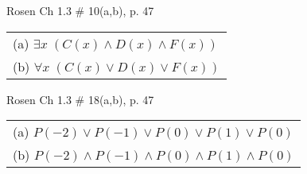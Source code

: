 \documentclass[12pt,addpoints]{exam}
\begin{document}
\begin{questions}
\question[4] Rosen Ch 1.3 \# 10(a,b), p. 47 
	\begin{solution}
    \begin{tabular}{l}
    (a) $\exists x\; (C(x) \wedge D(x) \wedge F(x))$ \\
    (b) $\forall x\; (C(x) \vee D(x) \vee F(x))$ \\
    \end{tabular}
    \end{solution}

\question[4] Rosen Ch 1.3 \# 18(a,b), p. 47 
	\begin{solution}
    \begin{tabular}{l}
    (a) $P(-2) \vee P(-1) \vee P(0) \vee P(1) \vee P(0)$ \\
    (b) $P(-2) \wedge P(-1) \wedge P(0) \wedge P(1) \wedge P(0)$ \\
    \end{tabular}
    \end{solution}


\end{questions}
\end{document}
